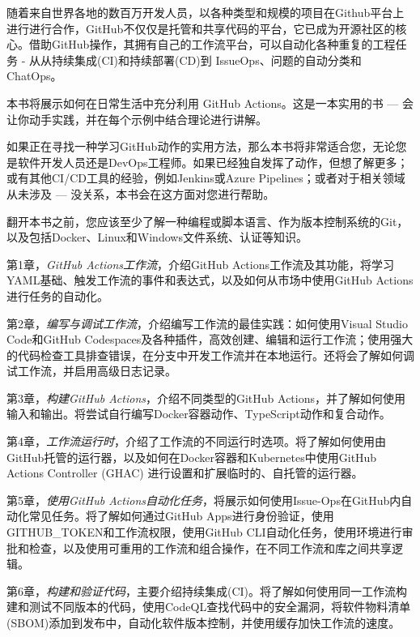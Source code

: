 随着来自世界各地的数百万开发人员，以各种类型和规模的项目在Github平台上进行进行合作，GitHub不仅仅是托管和共享代码的平台，它已成为开源社区的核心。借助GitHub操作，其拥有自己的工作流平台，可以自动化各种重复的工程任务 - 从从持续集成(CI)和持续部署(CD)到 IssueOps、问题的自动分类和 ChatOps。

本书将展示如何在日常生活中充分利用 GitHub Actions。这是一本实用的书  ---  会让你动手实践，并在每个示例中结合理论进行讲解。


如果正在寻找一种学习GitHub动作的实用方法，那么本书将非常适合您，无论您是软件开发人员还是DevOps工程师。如果已经独自发挥了动作，但想了解更多；或有其他CI/CD工具的经验，例如Jenkins或Azure Pipelines；或者对于相关领域从未涉及  ---  没关系，本书会在这方面对您进行帮助。

翻开本书之前，您应该至少了解一种编程或脚本语言、作为版本控制系统的Git，以及包括Docker、Linux和Windows文件系统、认证等知识。


第1章，\textit{GitHub Actions工作流}，介绍GitHub Actions工作流及其功能，将学习YAML基础、触发工作流的事件和表达式，以及如何从市场中使用GitHub Actions进行任务的自动化。

第2章，\textit{编写与调试工作流}，介绍编写工作流的最佳实践：如何使用Visual Studio Code和GitHub Codespaces及各种插件，高效创建、编辑和运行工作流；使用强大的代码检查工具排查错误，在分支中开发工作流并在本地运行。还将会了解如何调试工作流，并启用高级日志记录。

第3章，\textit{构建GitHub Actions}，介绍不同类型的GitHub Actions，并了解如何使用输入和输出。将尝试自行编写Docker容器动作、TypeScript动作和复合动作。

第4章，\textit{工作流运行时}，介绍了工作流的不同运行时选项。将了解如何使用由GitHub托管的运行器，以及如何在Docker容器和Kubernetes中使用GitHub Actions Controller (GHAC) 进行设置和扩展临时的、自托管的运行器。

第5章，\textit{使用GitHub Actions自动化任务}，将展示如何使用Issue-Ops在GitHub内自动化常见任务。将了解如何通过GitHub Apps进行身份验证，使用GITHUB\_TOKEN和工作流权限，使用GitHub CLI自动化任务，使用环境进行审批和检查，以及使用可重用的工作流和组合操作，在不同工作流和库之间共享逻辑。

第6章，\textit{构建和验证代码}，主要介绍持续集成(CI)。将了解如何使用同一工作流构建和测试不同版本的代码，使用CodeQL查找代码中的安全漏洞，将软件物料清单(SBOM)添加到发布中，自动化软件版本控制，并使用缓存加快工作流的速度。

